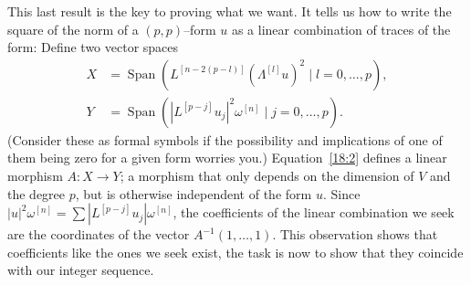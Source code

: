 \documentclass[11pt,a4paper]{amsart}
\def\^#1{^{[#1]}}
\theoremstyle{definition}
\numberwithin{equation}{section}
\begin{document}
This last result is the key to proving what we want. It tells us how to
write the square of the norm of a $(p,p)$--form $u$ as a linear
combination of traces of the form: Define two vector spaces 
\begin{align*}
X &= \operatorname{Span}(L\^{n-2(p-l)} (\Lambda\^ l u)^2 \mid l = 0,\ldots,p),
\\
Y &= \operatorname{Span}(|L\^{p-j}u_j|^2 \omega\^{n} \mid j=0,\ldots,p).
\end{align*}
(Consider these as formal symbols if the possibility and implications of
one of them being zero for a given form worries you.) Equation~\eqref{18:2}
defines a linear morphism $A : X \to Y$; a morphism that only depends
on the dimension of $V$ and the degree $p$, but is otherwise independent of
the form $u$. Since $|u|^2\omega\^n = \sum |L\^{p-j}u_j| \omega\^n$,  
the coefficients of the linear combination we seek are the coordinates of
the vector $A^{-1}(1,\ldots,1)$. This observation shows that coefficients like the ones we seek exist, the task is now to show that they coincide with our integer sequence.
\end{document}
